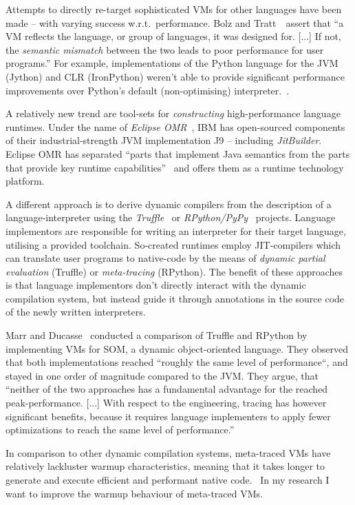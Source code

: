 Attempts to directly re-target sophisticated VMs for other languages have been
made -- with varying success w.r.t.~performance. Bolz and
Tratt~\cite{bolz14impact}~assert that ``a VM reflects the language, or group of
languages, it was designed for. [...] If not, the \emph{semantic mismatch}
between the two leads to poor performance for user programs.'' For example,
implementations of the Python language for the JVM (Jython) and CLR (IronPython)
weren't able to provide significant performance improvements over Python's
default (non-optimising) interpreter.~\cite{bolz14impact}.

A relatively new trend are tool-sets for \emph{constructing} high-performance
language runtimes. Under the name of \emph{Eclipse
OMR}~\cite{gaudet2016rebuilding}, IBM has open-sourced components of their
industrial-strength JVM implementation J9 -- including \emph{JitBuilder}.
Eclipse OMR has separated ``parts that implement Java semantics from the parts
that provide key runtime capabilities''~\cite{eclipseOMR} and offers them as a
runtime technology platform.

A different approach is to derive dynamic compilers from the description of a
language-interpreter using the
\emph{Truffle}~\cite{wurthinger2013one} or
\emph{RPython/PyPy}~\cite{bolz2009tracing} projects. Language implementors are
responsible for writing an interpreter for their target language, utilising a
provided toolchain. So-created runtimes employ JIT-compilers which can translate
user programs to native-code by the means of \emph{dynamic partial evaluation}
(Truffle) or \emph{meta-tracing} (RPython). The benefit of these approaches is that
language implementors don't directly interact with the dynamic compilation
system, but instead guide it through annotations in the source code of the
newly written interpreters.

Marr and Ducasse~\cite{marr2015tracing} conducted a  comparison of Truffle and
RPython by implementing VMs for SOM, a dynamic object-oriented language. They
observed that both implementations reached ``roughly the same level of
performance``, and stayed in one order of magnitude compared to the JVM. They
argue, that ``neither of the two approaches has a fundamental advantage for the
reached peak-performance. [...] With respect to the engineering, tracing has
however significant benefits, because it requires language implementers to apply
fewer optimizations to reach the same level of performance.''

In comparison to other dynamic compilation systems, meta-traced VMs have
relatively lackluster warmup characteristics, meaning that it takes longer to
generate and execute efficient and performant native
code.~\cite{barrett2016virtual} In my research I want to improve the warmup
behaviour of meta-traced VMs.


